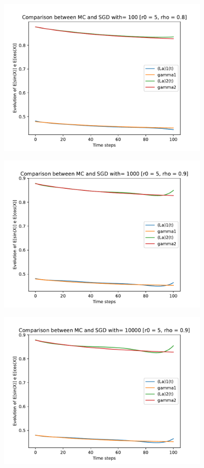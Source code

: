 \documentclass[a4paper,11pt,openright]{report}
\begin{document}
\begin{figure}[H]
\centering
\includegraphics[width=0.9\textwidth]{images/graphs T = 1/n = 6, M = 100 sine and cosine.pdf}
\end{figure}
\begin{figure}[H]
\centering
\includegraphics[width=0.9\textwidth]{images/graphs T = 1/n = 6, M = 1000 sine and cosine.pdf}
\end{figure}
\begin{figure}[H]
\centering
\includegraphics[width=0.9\textwidth]{images/graphs T = 1/n = 6, M = 10000 sine and cosine.pdf}
\end{figure}
\newpage
\end{document}
